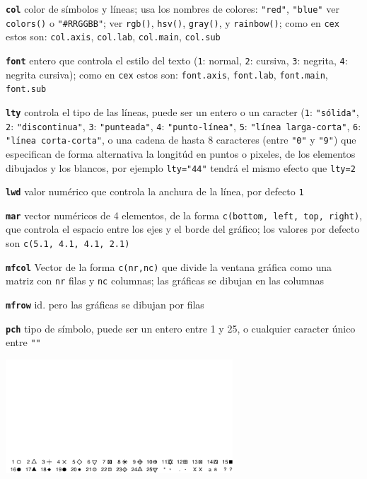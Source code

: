 \documentclass[10pt,landscape]{article}
\newcommand{\code}{\texttt}
\newcommand{\bcode}[1]{\texttt{\textbf{#1}}}
\begin{document}
\begin{multicols*}{3}
\bcode{col}  color de símbolos y líneas; usa los nombres de colores:
\code{"red"}, \code{"blue"} ver \code{colors()} o \code{"\#RRGGBB"};
ver \code{rgb()}, \code{hsv()}, \code{gray()}, y \code{rainbow()}; como en \code{cex} estos son: \code{col.axis}, \code{col.lab}, \code{col.main}, \code{col.sub}

\bcode{font}  entero que controla el estilo del texto (\code{1}: normal, \code{2}: cursiva, \code{3}: negrita, \code{4}: negrita cursiva); como en \code{cex} estos son: \code{font.axis}, \code{font.lab}, \code{font.main}, \code{font.sub}

\bcode{lty}  controla el tipo de las líneas, puede ser un entero o un caracter (\code{1}: \code{"sólida"}, \code{2}: \code{"discontinua"}, \code{3}: \code{"punteada"}, \code{4}: \code{"punto-línea"}, \code{5}: \code{"línea larga-corta"}, \code{6}: \code{"línea corta-corta"}, o una cadena de hasta 8 caracteres (entre \code{"0"} y \code{"9"}) que especifican de forma alternativa la longitúd en puntos o pixeles, de los elementos dibujados y los blancos, por ejemplo \code{lty="44"} tendrá el mismo efecto que \code{lty=2}

\bcode{lwd}  valor numérico que controla la anchura de la línea, por defecto \code{1}

\bcode{mar} vector numéricos de 4 elementos, de la forma \code{c(bottom, left, top, right)}, que controla el espacio entre los ejes y el borde del gráfico; los valores por defecto son \code{c(5.1, 4.1, 4.1, 2.1)}

\bcode{mfcol} Vector de la forma \code{c(nr,nc)} que divide la ventana gráfica como una matriz con \code{nr} filas y \code{nc} columnas; las gráficas se dibujan en las columnas

\bcode{mfrow} id. pero las gráficas se dibujan por filas

\bcode{pch}  tipo de símbolo, puede ser un entero entre 1 y 25, o cualquier caracter único entre \code{""}

\samepage\includegraphics[width=8.5cm]{files/pch_symbol} 






\end{multicols*}
\end{document}

